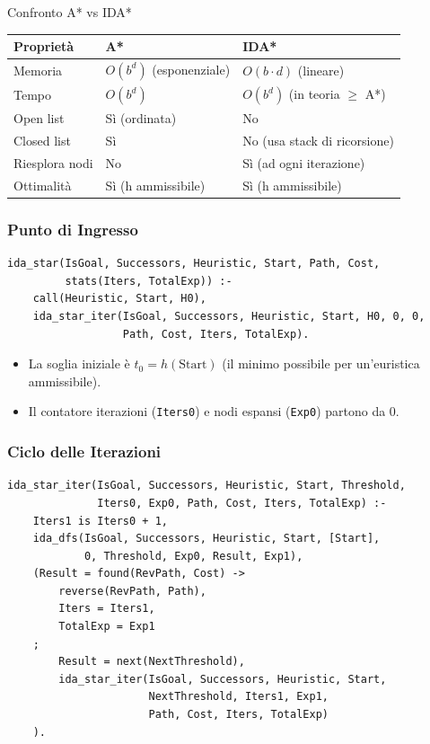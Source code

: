 \documentclass[12pt,a4paper]{article}
\begin{document}
\begin{defbox}{Confronto A* vs IDA*}
\begin{tabular}{lll}
\toprule
\textbf{Proprietà} & \textbf{A*} & \textbf{IDA*} \\
\midrule
Memoria & $O(b^d)$ (esponenziale) & $O(b \cdot d)$ (lineare) \\
Tempo   & $O(b^d)$               & $O(b^d)$ (in teoria $\ge$ A*) \\
Open list & Sì (ordinata)         & No \\
Closed list & Sì                  & No (usa stack di ricorsione) \\
Riesplora nodi & No               & Sì (ad ogni iterazione) \\
Ottimalità & Sì (h ammissibile)   & Sì (h ammissibile) \\
\bottomrule
\end{tabular}
\end{defbox}

\subsubsection{Punto di Ingresso}

\begin{lstlisting}
ida_star(IsGoal, Successors, Heuristic, Start, Path, Cost,
         stats(Iters, TotalExp)) :-
    call(Heuristic, Start, H0),
    ida_star_iter(IsGoal, Successors, Heuristic, Start, H0, 0, 0,
                  Path, Cost, Iters, TotalExp).
\end{lstlisting}

\begin{itemize}[noitemsep]
  \item La soglia iniziale è $t_0 = h(\text{Start})$ (il minimo possibile per un'euristica ammissibile).
  \item Il contatore iterazioni (\texttt{Iters0}) e nodi espansi (\texttt{Exp0}) partono da 0.
\end{itemize}

\subsubsection{Ciclo delle Iterazioni}

\begin{lstlisting}
ida_star_iter(IsGoal, Successors, Heuristic, Start, Threshold,
              Iters0, Exp0, Path, Cost, Iters, TotalExp) :-
    Iters1 is Iters0 + 1,
    ida_dfs(IsGoal, Successors, Heuristic, Start, [Start],
            0, Threshold, Exp0, Result, Exp1),
    (Result = found(RevPath, Cost) ->
        reverse(RevPath, Path),
        Iters = Iters1,
        TotalExp = Exp1
    ;
        Result = next(NextThreshold),
        ida_star_iter(IsGoal, Successors, Heuristic, Start,
                      NextThreshold, Iters1, Exp1,
                      Path, Cost, Iters, TotalExp)
    ).
\end{lstlisting}
\end{document}
